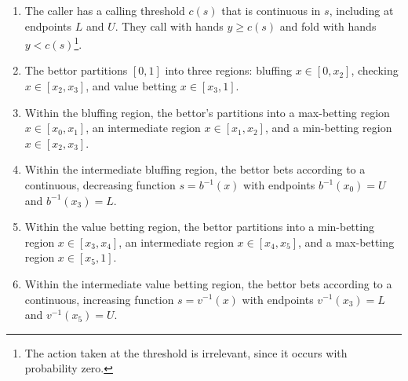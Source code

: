 \documentclass[../../main/main.tex]{subfiles}
\begin{document}
    \begin{enumerate}
        \item The caller has a calling threshold $c(s)$ that is continuous in $s$, including at endpoints $L$ and $U$. They call with hands $y \geq c(s)$ and fold with hands $y < c(s)$\footnote{The action taken at the threshold is irrelevant, since it occurs with probability zero.}.
        \item The bettor partitions $[0,1]$ into three regions: bluffing $x \in [0,x_2]$, checking $x \in [x_2,x_3]$, and value betting $x \in [x_3,1]$.
        \item Within the bluffing region, the bettor's partitions into a max-betting region $x \in [x_0,x_1]$, an intermediate region $x \in [x_1,x_2]$, and a min-betting region $x \in [x_2,x_3]$.
        \item Within the intermediate bluffing region, the bettor bets according to a continuous, decreasing function $s=b^{-1}(x)$ with endpoints $b^{-1}(x_0)=U$ and $b^{-1}(x_3)=L$.
        \item Within the value betting region, the bettor partitions into a min-betting region $x \in [x_3,x_4]$, an intermediate region $x \in [x_4,x_5]$, and a max-betting region $x \in [x_5,1]$.
        \item Within the intermediate value betting region, the bettor bets according to a continuous, increasing function $s=v^{-1}(x)$ with endpoints $v^{-1}(x_3)=L$ and $v^{-1}(x_5)=U$.
    \end{enumerate}



\end{document}
